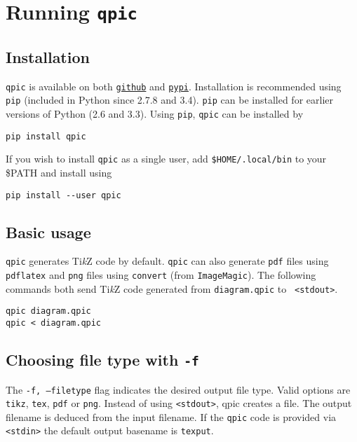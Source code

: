 \documentclass[twoside,12pt]{article}
\newcommand{\qpicpy}{{\tt qpic}\xspace}
\newcommand{\TikZ}{Ti\emph{k}Z\xspace}
\begin{document}
\section{Running \qpicpy}\label{sec-run}
\subsection{Installation}
\qpicpy is available on both \href{https://github.com/qpic/qpic}{\tt github}
and \href{https://testpypi.python.org/pypi}{\tt pypi}. Installation is recommended using {\tt pip} (included
in Python since 2.7.8 and 3.4). {\tt pip} can be installed for earlier versions of Python (2.6 and 3.3).
Using {\tt pip}, \qpicpy can be installed by

\begin{minipage}{5in}
\begin{lstlisting}[basicstyle=\normalsize\ttfamily,numbers=none]
pip install qpic
\end{lstlisting}
\end{minipage}

If you wish to install \qpicpy as a single user, add {\tt \$HOME/.local/bin} to your {\$PATH} and install using

\begin{minipage}{5in}
\begin{lstlisting}[basicstyle=\normalsize\ttfamily,numbers=none]
pip install --user qpic
\end{lstlisting}
\end{minipage}

\subsection{Basic usage}
\qpicpy generates \TikZ code by default. \qpicpy can also generate {\tt pdf} files
using {\tt pdflatex} and {\tt png} files using
{\tt convert} (from {\tt ImageMagic}). The following commands both send \TikZ code generated from {\tt diagram.qpic} to {\tt
<stdout>}.

\begin{minipage}{5in}
\begin{lstlisting}[basicstyle=\normalsize\ttfamily,numbers=none]
qpic diagram.qpic
qpic < diagram.qpic
\end{lstlisting}
\end{minipage}

\subsection{Choosing file type with {\tt -f}}
The {\tt -f, --filetype} flag indicates the desired output file type. Valid options are {\tt
tikz}, {\tt tex}, {\tt pdf} or {\tt png}. Instead of using {\tt <stdout>}, qpic creates a file. The output filename is deduced from
the input filename. If the {\tt qpic} code is provided via {\tt <stdin>} the
default output basename is {\tt texput}.
\end{document}
